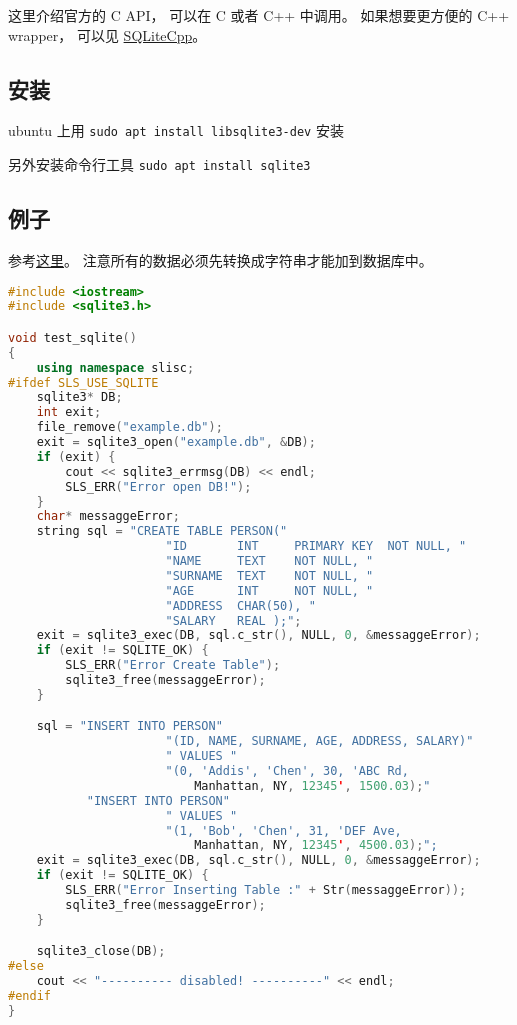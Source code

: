 
\begin{issues}
\issueDraft
\end{issues}


这里介绍官方的 C API， 可以在 C 或者 C++ 中调用。 如果想要更方便的 C++ wrapper， 可以见 \href{https://github.com/SRombauts/SQLiteCpp}{SQLiteCpp}。

\subsection{安装}
ubuntu 上用 \verb`sudo apt install libsqlite3-dev` 安装

另外安装命令行工具 \verb`sudo apt install sqlite3`

\subsection{例子}
参考\href{https://www.tutorialspoint.com/sqlite/sqlite_c_cpp.htm}{这里}。 注意所有的数据必须先转换成字符串才能加到数据库中。
\begin{lstlisting}[language=cpp]
#include <iostream>
#include <sqlite3.h>

void test_sqlite()
{
	using namespace slisc;
#ifdef SLS_USE_SQLITE
	sqlite3* DB;
	int exit;
	file_remove("example.db");
	exit = sqlite3_open("example.db", &DB);
	if (exit) {
		cout << sqlite3_errmsg(DB) << endl;
		SLS_ERR("Error open DB!");
	}
	char* messaggeError;
	string sql = "CREATE TABLE PERSON("
					  "ID       INT     PRIMARY KEY  NOT NULL, "
					  "NAME     TEXT    NOT NULL, "
					  "SURNAME  TEXT    NOT NULL, "
					  "AGE      INT     NOT NULL, "
					  "ADDRESS  CHAR(50), "
					  "SALARY   REAL );";
	exit = sqlite3_exec(DB, sql.c_str(), NULL, 0, &messaggeError);
	if (exit != SQLITE_OK) {
		SLS_ERR("Error Create Table");
		sqlite3_free(messaggeError);
	}

	sql = "INSERT INTO PERSON"
					  "(ID, NAME, SURNAME, AGE, ADDRESS, SALARY)"
					  " VALUES "
					  "(0, 'Addis', 'Chen', 30, 'ABC Rd,
                          Manhattan, NY, 12345', 1500.03);"
		   "INSERT INTO PERSON"
					  " VALUES "
					  "(1, 'Bob', 'Chen', 31, 'DEF Ave,
                          Manhattan, NY, 12345', 4500.03);";
	exit = sqlite3_exec(DB, sql.c_str(), NULL, 0, &messaggeError);
	if (exit != SQLITE_OK) {
		SLS_ERR("Error Inserting Table :" + Str(messaggeError));
		sqlite3_free(messaggeError);
	}

	sqlite3_close(DB);
#else
	cout << "---------- disabled! ----------" << endl;
#endif
}
\end{lstlisting}

